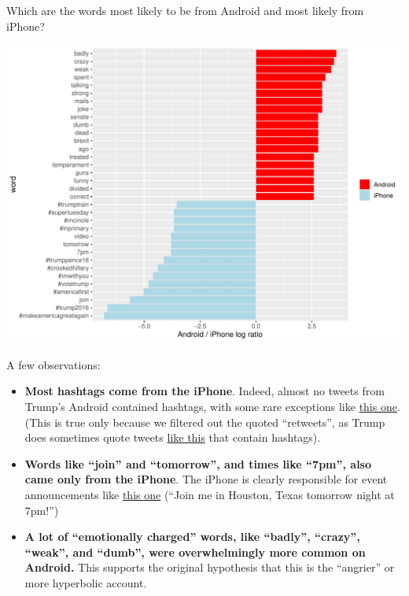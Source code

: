 \documentclass[
]{jss}
\begin{document}
Which are the words most likely to be from Android and most likely from
iPhone?

\begin{CodeChunk}


\begin{center}\includegraphics{Live_Demo2_files/figure-latex/android_iphone_ratios_plot-1} \end{center}

\end{CodeChunk}

A few observations:

\begin{itemize}
\item
  \textbf{Most hashtags come from the iPhone}. Indeed, almost no tweets
  from Trump's Android contained hashtags, with some rare exceptions
  like
  \href{https://twitter.com/realDonaldTrump/status/753960134422900736}{this
  one}. (This is true only because we filtered out the quoted
  ``retweets'', as Trump does sometimes quote tweets
  \href{https://twitter.com/realDonaldTrump/status/731805331425218560}{like
  this} that contain hashtags).
\item
  \textbf{Words like ``join'' and ``tomorrow'', and times like ``7pm'',
  also came only from the iPhone}. The iPhone is clearly responsible for
  event announcements like
  \href{https://twitter.com/realDonaldTrump/status/743522630230228993}{this
  one} (``Join me in Houston, Texas tomorrow night at 7pm!'')
\item
  \textbf{A lot of ``emotionally charged'' words, like ``badly'',
  ``crazy'', ``weak'', and ``dumb'', were overwhelmingly more common on
  Android.} This supports the original hypothesis that this is the
  ``angrier'' or more hyperbolic account.
\end{itemize}
\end{document}
